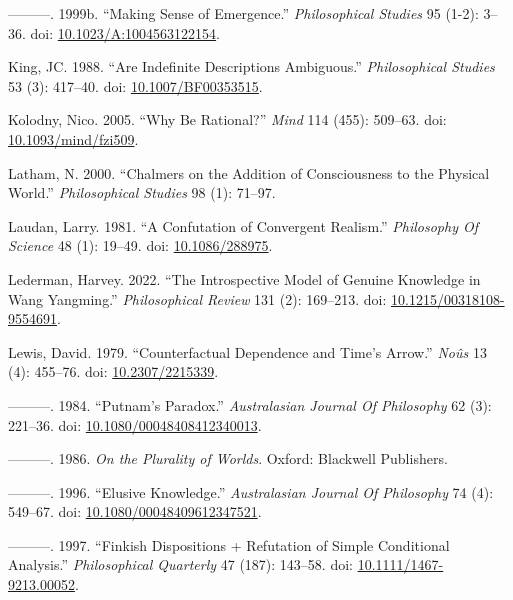 \documentclass[
  10pt,
  letterpaper,
  DIV=11,
  numbers=noendperiod,
  twoside]{scrartcl}
\newlength{\cslhangindent}
\newenvironment{CSLReferences}[2] %
 {\begin{list}{}{%
  \setlength{\itemindent}{0pt}
  \setlength{\leftmargin}{0pt}
  \setlength{\parsep}{0pt}
  \ifodd #1
   \setlength{\leftmargin}{\cslhangindent}
   \setlength{\itemindent}{-1\cslhangindent}
  \fi
  \setlength{\itemsep}{#2\baselineskip}}}
 {\end{list}}
\begin{document}
\begin{CSLReferences}{1}{0}
---------. 1999b. {``Making Sense of Emergence.''} \emph{Philosophical
Studies} 95 (1-2): 3--36. doi:
\href{https://doi.org/10.1023/A:1004563122154}{10.1023/A:1004563122154}.

King, JC. 1988. {``Are Indefinite Descriptions Ambiguous.''}
\emph{Philosophical Studies} 53 (3): 417--40. doi:
\href{https://doi.org/10.1007/BF00353515}{10.1007/BF00353515}.

Kolodny, Nico. 2005. {``Why Be Rational?''} \emph{Mind} 114 (455):
509--63. doi:
\href{https://doi.org/10.1093/mind/fzi509}{10.1093/mind/fzi509}.

Latham, N. 2000. {``Chalmers on the Addition of Consciousness to the
Physical World.''} \emph{Philosophical Studies} 98 (1): 71--97.

Laudan, Larry. 1981. {``A Confutation of Convergent Realism.''}
\emph{Philosophy Of Science} 48 (1): 19--49. doi:
\href{https://doi.org/10.1086/288975}{10.1086/288975}.

Lederman, Harvey. 2022. {``The Introspective Model of Genuine Knowledge
in Wang Yangming.''} \emph{Philosophical Review} 131 (2): 169--213. doi:
\href{https://doi.org/10.1215/00318108-9554691}{10.1215/00318108-9554691}.

Lewis, David. 1979. {``Counterfactual Dependence and Time's Arrow.''}
\emph{No{û}s} 13 (4): 455--76. doi:
\href{https://doi.org/10.2307/2215339}{10.2307/2215339}.

---------. 1984. {``Putnam's Paradox.''} \emph{Australasian Journal Of
Philosophy} 62 (3): 221--36. doi:
\href{https://doi.org/10.1080/00048408412340013}{10.1080/00048408412340013}.

---------. 1986. \emph{On the Plurality of Worlds}. Oxford: Blackwell
Publishers.

---------. 1996. {``Elusive Knowledge.''} \emph{Australasian Journal Of
Philosophy} 74 (4): 549--67. doi:
\href{https://doi.org/10.1080/00048409612347521}{10.1080/00048409612347521}.

---------. 1997. {``Finkish Dispositions + Refutation of Simple
Conditional Analysis.''} \emph{Philosophical Quarterly} 47 (187):
143--58. doi:
\href{https://doi.org/10.1111/1467-9213.00052}{10.1111/1467-9213.00052}.


\end{CSLReferences}
\end{document}
